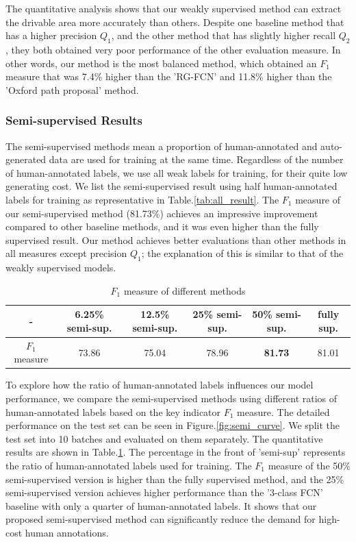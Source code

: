 \documentclass[letterpaper, 10 pt, conference]{ieeeconf}  %
\begin{document}
The quantitative analysis shows that our weakly supervised method can extract the drivable area more accurately than others. Despite one baseline method that has a higher precision $Q_1$, and the other method that has slightly higher recall $Q_2$, they both obtained very poor performance of the other evaluation measure. In other words, our method is the most balanced method, which obtained an $F_1$ measure that was 7.4\% higher than the 'RG-FCN' and 11.8\% higher than the 'Oxford path proposal' method.


\subsubsection{Semi-supervised Results}
The semi-supervised methods mean a proportion of human-annotated and auto-generated data are used for training at the same time. Regardless of the number of human-annotated labels, we use all weak labels for training, for their quite low generating cost.
We list the semi-supervised result using half human-annotated labels for training as representative in Table.\ref{tab:all_result}. The $F_1$ measure of our semi-supervised method (81.73\%) achieves an impressive improvement compared to other baseline methods, and it was even higher than the fully supervised result.
Our method achieves better evaluations than other methods in all measures except precision $Q_1$; the explanation of this is similar to that of the weakly supervised models. 
\begin{table}
	\caption{$F_1$ measure of different methods}
	\label{tab:semic}
	\centering
	\renewcommand{\arraystretch}{1.5}
	\begin{tabular}{c|ccccc}
		\hline
		- & 6.25\% semi-sup. & 12.5\% semi-sup. & 25\% semi-sup. & 50\% semi-sup. & fully sup.	\\
		\hline
		$F_1$ measure & 73.86 & 75.04 & 78.96 & \textbf{81.73} & 81.01 	\\
		\hline
	\end{tabular}
	\vspace{-2mm}
\end{table}

To explore how the ratio of human-annotated labels influences our model performance, we compare the semi-supervised methods using different ratios of human-annotated labels based on the key indicator $F_1$ measure. The detailed performance on the test set can be seen in Figure.\ref{fig:semi_curve}. We split the test set into 10 batches and evaluated on them separately. The quantitative results are shown in Table.\ref{tab:semic}. The percentage in the front of 'semi-sup' represents the ratio of human-annotated labels used for training. The $F_1$ measure of the 50\% semi-supervised version is higher than the fully supervised method, and the 25\% semi-supervised version achieves higher performance than the '3-class FCN' baseline with only a quarter of human-annotated labels. It shows that our proposed semi-supervised method can significantly reduce the demand for high-cost human annotations.
\end{document}
